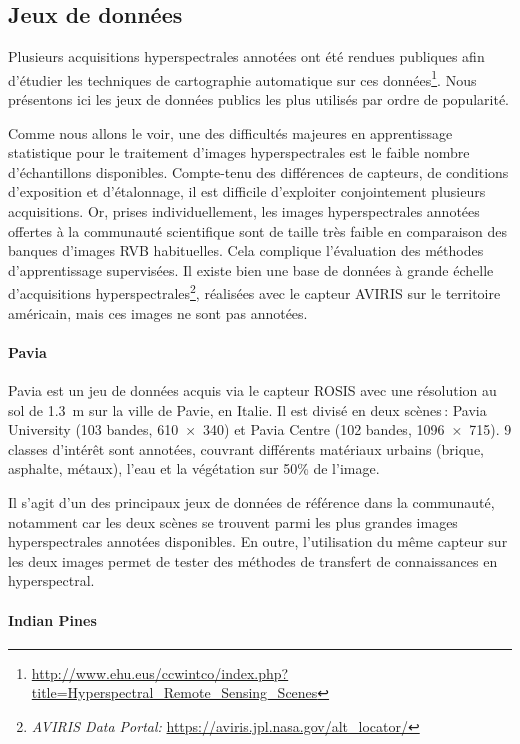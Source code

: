 \subsection{Jeux de données}
\label{sec:hyperspectral_datasets}

Plusieurs acquisitions hyperspectrales annotées ont été rendues publiques afin d'étudier les techniques de cartographie automatique sur ces données\footnote{\url{http://www.ehu.eus/ccwintco/index.php?title=Hyperspectral_Remote_Sensing_Scenes}}. Nous présentons ici les jeux de données publics les plus utilisés par ordre de popularité.

Comme nous allons le voir, une des difficultés majeures en apprentissage statistique pour le traitement d'images hyperspectrales est le faible nombre d'échantillons disponibles. Compte-tenu des différences de capteurs, de conditions d'exposition et d'étalonnage, il est difficile d'exploiter conjointement plusieurs acquisitions. Or, prises individuellement, les images hyperspectrales annotées offertes à la communauté scientifique sont de taille très faible en comparaison des banques d'images \gls{RVB} habituelles. Cela complique l'évaluation des méthodes d'apprentissage supervisées. Il existe bien une base de données à grande échelle d'acquisitions hyperspectrales\footnote{\emph{AVIRIS Data Portal:} \url{https://aviris.jpl.nasa.gov/alt_locator/}}, réalisées avec le capteur \gls{AVIRIS} sur le territoire américain, mais ces images ne sont pas annotées.

\paragraph{Pavia}

Pavia est un jeu de données acquis via le capteur ROSIS avec une résolution au sol de \SI{1,3}{\meter} sur la ville de Pavie, en Italie. Il est divisé en deux scènes\,: Pavia University (103 bandes, \SI{610x340}{\px}) et Pavia Centre (102 bandes, \SI{1096x715}{\px}). 9 classes d'intérêt sont annotées, couvrant différents matériaux urbains (brique, asphalte, métaux), l'eau et la végétation sur 50\% de l'image.

Il s'agit d'un des principaux jeux de données de référence dans la communauté, notamment car les deux scènes se trouvent parmi les plus grandes images hyperspectrales annotées disponibles. En outre, l'utilisation du même capteur sur les deux images permet de tester des méthodes de transfert de connaissances en hyperspectral.

\paragraph{Indian Pines}


